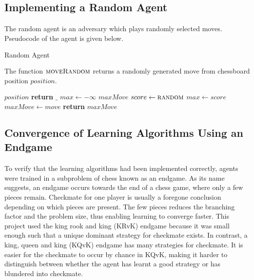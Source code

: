 \documentclass[12pt,a4paper]{book}
\begin{document}
\subsection{Implementing a Random Agent}

\paragraph{} The random agent is an adversary which plays randomly selected moves. Pseudocode of the agent is given below.

\begin{algorithm}
  \caption{Random Agent}
  The function $\Call{moveRandom}{}$ returns a randomly generated move from chessboard position $position$.
  \begin{algorithmic}[1]
     {$position$}
    \State \textbf{return} $\_$
    \EndIf
    \State $max \gets -\infty$
    \State $maxMove$
    \State $score \gets \Call{random}{}$
    \State $max \gets score$
    \State $maxMove \gets move$
	\EndIf
    \EndFor
    \State \textbf{return} $maxMove$
    \EndFunction
  \end{algorithmic}
\end{algorithm}

\subsection{Convergence of Learning Algorithms Using an Endgame}

\paragraph{} To verify that the learning algorithms had been implemented correctly, agents were trained in a subproblem of chess known as an endgame. As its name suggests, an endgame occurs towards the end of a chess game, where only a few pieces remain. Checkmate for one player is usually a foregone conclusion depending on which pieces are present. The few pieces reduces the branching factor and the problem size, thus enabling learning to converge faster. This project used the king rook and king (KRvK) endgame because it was small enough such that a unique dominant strategy for checkmate exists. In contrast, a king, queen and king (KQvK) endgame has many strategies for checkmate. It is easier for the checkmate to occur by chance in KQvK, making it harder to distinguish between whether the agent has learnt a good strategy or has blundered into checkmate.
\end{document}
